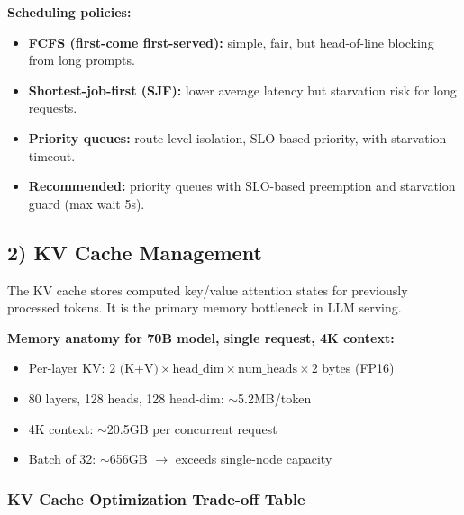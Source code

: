 \textbf{Scheduling policies:}

\begin{itemize}
  \item \textbf{FCFS (first-come first-served):} simple, fair, but head-of-line blocking from long prompts.
  \item \textbf{Shortest-job-first (SJF):} lower average latency but starvation risk for long requests.
  \item \textbf{Priority queues:} route-level isolation, SLO-based priority, with starvation timeout.
  \item \textbf{Recommended:} priority queues with SLO-based preemption and starvation guard (max wait 5s).
\end{itemize}

\subsection*{2) KV Cache Management}

The KV cache stores computed key/value attention states for previously processed tokens. It is the primary memory bottleneck in LLM serving.

\textbf{Memory anatomy for 70B model, single request, 4K context:}

\begin{itemize}
  \item Per-layer KV: $2 \text{ (K+V)} \times \text{head\_dim} \times \text{num\_heads} \times 2$ bytes (FP16)
  \item 80 layers, 128 heads, 128 head-dim: $\sim$5.2MB/token
  \item 4K context: $\sim$20.5GB per concurrent request
  \item Batch of 32: $\sim$656GB $\rightarrow$ exceeds single-node capacity
\end{itemize}

\subsubsection*{KV Cache Optimization Trade-off Table}

